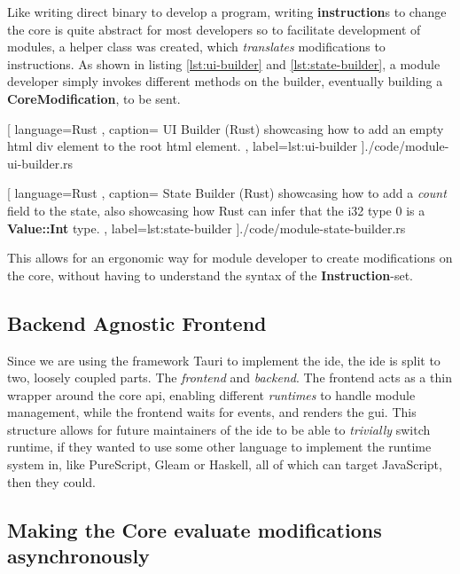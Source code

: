 Like writing direct binary to develop a program, writing \textbf{instruction}s to
change the core is quite abstract for most developers so to facilitate development
of modules, a helper class was created, which \textit{translates} modifications
to instructions. As shown in listing \ref{lst:ui-builder} and
\ref{lst:state-builder}, a module developer simply invokes different methods on
the builder, eventually building a \textbf{CoreModification}, to be sent.

\begin{center}
  
   [ language=Rust
   , caption={
     UI Builder (Rust) showcasing how to add an empty \gls{html} div element to
     the root \gls{html} element.
   }
   , label=lst:ui-builder
   ]{./code/module-ui-builder.rs}
\end{center}

\begin{center}
  
   [ language=Rust
   , caption={
     State Builder (Rust) showcasing how to add a \textit{count} field to the
     state, also showcasing how Rust can infer that the i32 type $0$ is
     a \textbf{Value::Int} type.
   }
   , label=lst:state-builder
   ]{./code/module-state-builder.rs}
\end{center}

This allows for an ergonomic way for module developer to create modifications on
the core, without having to understand the syntax of the
\textbf{Instruction}-set.

\subsection{Backend Agnostic Frontend}

Since we are using the framework Tauri to implement the \gls{ide}, the \gls{ide}
is split to two, loosely coupled parts. The \textit{frontend} and
\textit{backend}. The frontend acts as a thin wrapper around the core \gls{api},
enabling different \textit{runtimes} to handle module management, while the
frontend waits for events, and renders the \gls{gui}. This structure allows for
future maintainers of the \gls{ide} to be able to \textit{trivially} switch
runtime, if they wanted to use some other language to implement the runtime
system in, like PureScript, Gleam or Haskell, all of which can target
JavaScript, then they could.

\subsection{Making the Core evaluate modifications asynchronously}

